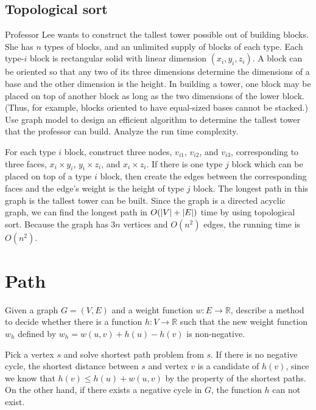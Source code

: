 \subsection{Topological sort}
\begin{Exercise}[origin={CYCU CSIE 92}]
Professor Lee wants to construct the tallest tower possible out of building blocks. She has $n$ types of blocks, and an unlimited supply of blocks of each type. Each type-$i$ block is rectangular solid with linear dimension $(x_i, y_i, z_i)$. A block can be oriented so that any two of its three dimensions determine the dimensions of a base and the other dimension is the height. In building a tower, one block may be placed on top of another block as long as the two dimensions of the lower block. (Thus, for example, blocks oriented to have equal-sized bases cannot be stacked.) Use graph model to design an efficient algorithm to determine the tallest tower that the professor can build. Analyze the run time complexity.
\end{Exercise}
\begin{Answer}
For each type $i$ block, construct three nodes, $v_{i1}$, $v_{i2}$, and $v_{i3}$, corresponding to three faces, $x_i \times y_i$, $y_i \times z_i$, and $x_i \times z_i$.  If there is one type $j$ block which can be placed on top of a type $i$ block, then create the edges between the corresponding faces and the edge's weight is the height of type $j$ block. The longest path in this graph is the tallest tower can be built. Since the graph is a directed acyclic graph, we can find the longest path in $O(\lvert V\rvert + \lvert E\rvert)$ time by using topological sort. Because the graph has $3n$ vertices and $O(n^2)$ edges, the running time is $O(n^2)$.
\end{Answer}

\section{Path}
\begin{Exercise}[title={Johnson's algorithm},origin={NTPU CSIE 100}]
Given a graph $G = (V, E)$ and a weight function $w: E \rightarrow \mathbb{R}$, describe a method to decide whether there is a function $h: V \rightarrow \mathbb{R}$ such that the new weight function $w_h$ defined by $w_h = w(u, v) + h(u) - h(v)$ is non-negative.
\end{Exercise}
\begin{Answer}
Pick a vertex $s$ and solve shortest path problem from $s$. If there is no negative cycle, the shortest distance between $s$ and vertex $v$ is a candidate of $h(v)$, since we know that $h(v) \leq h(u) + w(u, v)$ by the property of the shortest paths. On the other hand, if there exists a negative cycle in $G$, the function $h$ can not exist.
\end{Answer}

